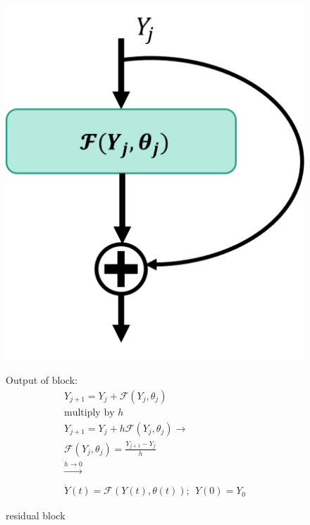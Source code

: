 \documentclass{article}
\theoremstyle{remark}
\begin{document}
\begin{figure}[H]
    \centering
    \begin{minipage}{0.45\textwidth}
        \centering
        \includegraphics[scale=0.5]{imgs/residual_block.png} %
        \caption{residual block}
    \end{minipage}\hfill
    \begin{minipage}{0.45\textwidth}
        \centering
        Output of block:
        \begin{gather}
            Y_{j+1} = Y_j + \mathcal{F}(Y_j, \theta_j) \nonumber \\
            \text{multiply by $h$} \nonumber  \\
            Y_{j+1} = Y_j + h\mathcal{F}(Y_j, \theta_j) \rightarrow \nonumber \\
            \mathcal{F}(Y_j, \theta_j) = \frac{Y_{j+1} - Y_j}{h} \nonumber \\
            \xrightarrow[]{h \rightarrow 0} \nonumber  \\
            \boxed{\dot{Y}(t) = \mathcal{F}(Y(t), \theta(t)); \ \ Y(0) = Y_0}
        \end{gather}
    \end{minipage}
\end{figure}
\end{document}
